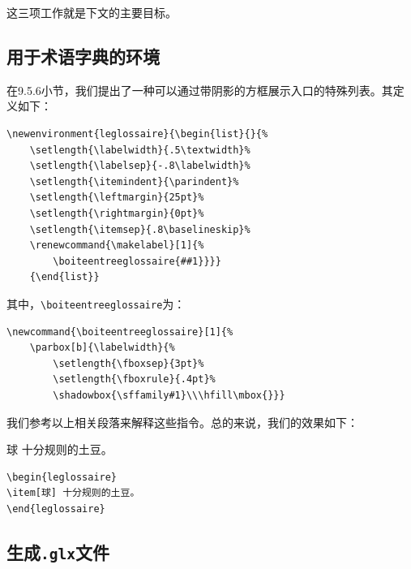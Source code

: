 这三项工作就是下文的主要目标。

\subsection{用于术语字典的环境}

在9.5.6小节，我们提出了一种可以通过带阴影的方框展示入口的特殊列表。其定义如下：

\begin{dmd}
\begin{verbatim}
\newenvironment{leglossaire}{\begin{list}{}{%
    \setlength{\labelwidth}{.5\textwidth}% 
    \setlength{\labelsep}{-.8\labelwidth}% 
    \setlength{\itemindent}{\parindent}% 
    \setlength{\leftmargin}{25pt}%
    \setlength{\rightmargin}{0pt}%
    \setlength{\itemsep}{.8\baselineskip}%
    \renewcommand{\makelabel}[1]{%
        \boiteentreeglossaire{##1}}}}
    {\end{list}}
\end{verbatim}
\end{dmd}

其中，\verb|\boiteentreeglossaire|为：

\begin{dmd}
\begin{verbatim}
\newcommand{\boiteentreeglossaire}[1]{% 
    \parbox[b]{\labelwidth}{%
        \setlength{\fboxsep}{3pt}% 
        \setlength{\fboxrule}{.4pt}% 
        \shadowbox{\sffamily#1}\\\hfill\mbox{}}}
\end{verbatim}
\end{dmd}

我们参考以上相关段落来解释这些指令。总的来说，我们的效果如下：

\begin{codelist}[11.28]{
\begin{leglossaire}
\item[球] 十分规则的土豆。
\end{leglossaire}
}\begin{verbatim}
\begin{leglossaire}
\item[球] 十分规则的土豆。
\end{leglossaire}
\end{verbatim}
\end{codelist}

\subsection{生成\texttt{.glx}文件}

